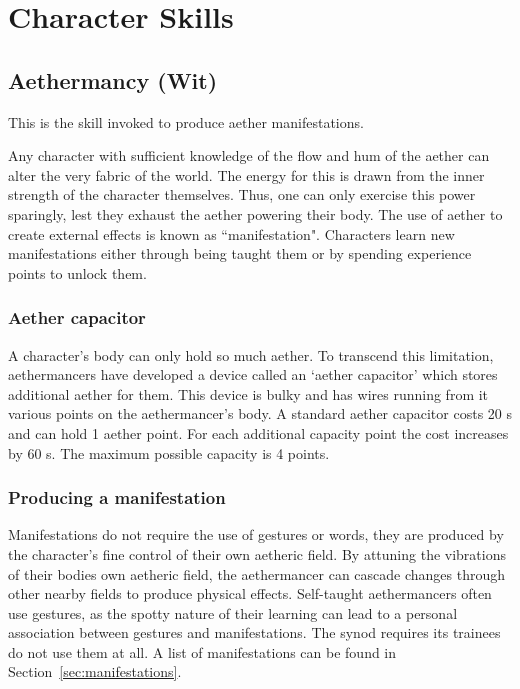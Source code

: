 \documentclass[a4paper,11pt,oneside]{book}
\begin{document}
\chapter{Character Skills}

\section{Aethermancy (Wit)}
\label{sec:aethermancy}
This is the skill invoked to produce aether manifestations. 

Any character with sufficient knowledge of the flow and hum of the aether can alter the very fabric of the world.  The energy for this is drawn from the inner strength of the character themselves. Thus, one can only exercise this power sparingly, lest they exhaust the aether powering their body. The use of aether to create external effects is known as ``manifestation". Characters learn new manifestations either through being taught them or by spending experience points to unlock them.

\subsection{Aether capacitor}
\label{sec:capacitor}
A character's body can only hold so much aether. To transcend this limitation, aethermancers have developed a device called an `aether capacitor' which stores additional aether for them. This device is bulky and has wires running from it various points on the aethermancer's body. A standard aether capacitor costs 20 s and can hold 1 aether point. For each additional capacity point the cost increases by 60 s. The maximum possible capacity is 4 points.


\subsection{Producing a manifestation}
Manifestations do not require the use of gestures or words, they are produced by the character's fine control of their own aetheric field. By attuning the vibrations of their bodies own aetheric field, the aethermancer can cascade changes through other nearby fields to produce physical effects. Self-taught aethermancers often use gestures, as the spotty nature of their learning can lead to a personal association between gestures and manifestations. The synod requires its trainees do not use them at all. A list of manifestations can be found in Section~\ref{sec:manifestations}.
\end{document}
